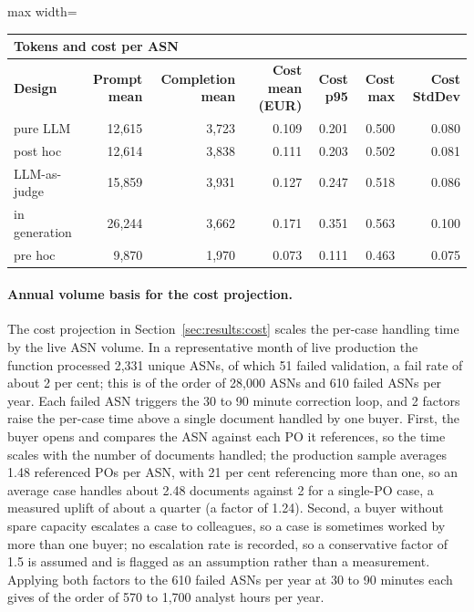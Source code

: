 \begin{table}[htbp]
\begin{adjustbox}{max width=\textwidth}
\begin{tabular}{@{}lrrrrrr@{}}
\multicolumn{7}{l}{\textbf{Tokens and cost per ASN}} \\
\toprule
\textbf{Design} & \textbf{Prompt mean} & \textbf{Completion mean} & \textbf{Cost mean (EUR)} & \textbf{Cost p95} & \textbf{Cost max} & \textbf{Cost StdDev} \\
\midrule
pure LLM      & 12{,}615 & 3{,}723 & 0.109 & 0.201 & 0.500 & 0.080 \\
post hoc      & 12{,}614 & 3{,}838 & 0.111 & 0.203 & 0.502 & 0.081 \\
LLM-as-judge  & 15{,}859 & 3{,}931 & 0.127 & 0.247 & 0.518 & 0.086 \\
in generation & 26{,}244 & 3{,}662 & 0.171 & 0.351 & 0.563 & 0.100 \\
pre hoc       & 9{,}870  & 1{,}970 & 0.073 & 0.111 & 0.463 & 0.075 \\
\bottomrule
\end{tabular}
\end{adjustbox}
\end{table}

\paragraph{Annual volume basis for the cost projection.} The cost projection in Section~\ref{sec:results:cost} scales the per-case handling time by the live ASN volume. In a representative month of live production the function processed 2,331 unique ASNs, of which 51 failed validation, a fail rate of about 2 per cent; this is of the order of 28,000 ASNs and 610 failed ASNs per year. Each failed ASN triggers the 30 to 90 minute correction loop, and 2 factors raise the per-case time above a single document handled by one buyer. First, the buyer opens and compares the ASN against each PO it references, so the time scales with the number of documents handled; the production sample averages 1.48 referenced POs per ASN, with 21 per cent referencing more than one, so an average case handles about 2.48 documents against 2 for a single-PO case, a measured uplift of about a quarter (a factor of 1.24). Second, a buyer without spare capacity escalates a case to colleagues, so a case is sometimes worked by more than one buyer; no escalation rate is recorded, so a conservative factor of 1.5 is assumed and is flagged as an assumption rather than a measurement. Applying both factors to the 610 failed ASNs per year at 30 to 90 minutes each gives of the order of 570 to 1,700 analyst hours per year.


